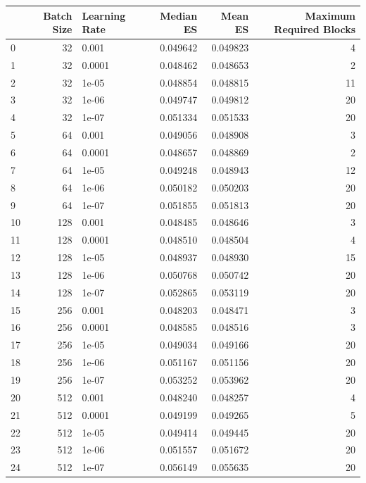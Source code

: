\begin{tabular}{lrlrrr}
\toprule
 & Batch Size & Learning Rate & Median ES & Mean ES & Maximum Required Blocks \\
\midrule
0 & 32 & 0.001 & 0.049642 & 0.049823 & 4 \\
1 & 32 & 0.0001 & 0.048462 & 0.048653 & 2 \\
2 & 32 & 1e-05 & 0.048854 & 0.048815 & 11 \\
3 & 32 & 1e-06 & 0.049747 & 0.049812 & 20 \\
4 & 32 & 1e-07 & 0.051334 & 0.051533 & 20 \\
5 & 64 & 0.001 & 0.049056 & 0.048908 & 3 \\
6 & 64 & 0.0001 & 0.048657 & 0.048869 & 2 \\
7 & 64 & 1e-05 & 0.049248 & 0.048943 & 12 \\
8 & 64 & 1e-06 & 0.050182 & 0.050203 & 20 \\
9 & 64 & 1e-07 & 0.051855 & 0.051813 & 20 \\
10 & 128 & 0.001 & 0.048485 & 0.048646 & 3 \\
11 & 128 & 0.0001 & 0.048510 & 0.048504 & 4 \\
12 & 128 & 1e-05 & 0.048937 & 0.048930 & 15 \\
13 & 128 & 1e-06 & 0.050768 & 0.050742 & 20 \\
14 & 128 & 1e-07 & 0.052865 & 0.053119 & 20 \\
15 & 256 & 0.001 & 0.048203 & 0.048471 & 3 \\
16 & 256 & 0.0001 & 0.048585 & 0.048516 & 3 \\
17 & 256 & 1e-05 & 0.049034 & 0.049166 & 20 \\
18 & 256 & 1e-06 & 0.051167 & 0.051156 & 20 \\
19 & 256 & 1e-07 & 0.053252 & 0.053962 & 20 \\
20 & 512 & 0.001 & 0.048240 & 0.048257 & 4 \\
21 & 512 & 0.0001 & 0.049199 & 0.049265 & 5 \\
22 & 512 & 1e-05 & 0.049414 & 0.049445 & 20 \\
23 & 512 & 1e-06 & 0.051557 & 0.051672 & 20 \\
24 & 512 & 1e-07 & 0.056149 & 0.055635 & 20 \\
\bottomrule
\end{tabular}
